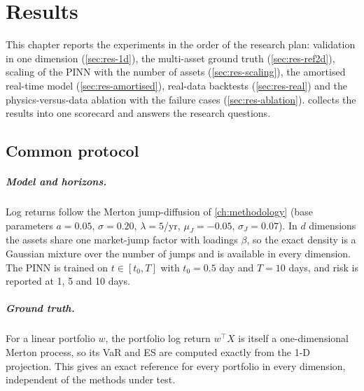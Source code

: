 \chapter{Results}
\label{ch:results}

This chapter reports the experiments in the order of the research plan: validation in one dimension
(\cref{sec:res-1d}), the multi-asset ground truth (\cref{sec:res-ref2d}), scaling of the PINN with the
number of assets (\cref{sec:res-scaling}), the amortised real-time model (\cref{sec:res-amortised}),
real-data backtests (\cref{sec:res-real}) and the physics-versus-data ablation with the failure cases
(\cref{sec:res-ablation}).  collects the results into one scorecard and answers the
research questions.

\section{Common protocol}
\label{sec:res-protocol}

\paragraph{Model and horizons.} Log returns follow the Merton jump-diffusion of \cref{ch:methodology}
(base parameters $a = 0.05$, $\sigma = 0.20$, $\lambda = 5$/yr, $\mu_J = -0.05$, $\sigma_J = 0.07$). In $d$
dimensions the assets share one market-jump factor with loadings $\beta$, so the exact density is a
Gaussian mixture over the number of jumps and is available in every dimension. The PINN is trained on
$t \in [t_0, T]$ with $t_0 = 0.5$ day and $T = 10$ days, and risk is reported at 1, 5 and 10 days.

\paragraph{Ground truth.} For a linear portfolio $w$, the portfolio log return $w^\top X$ is itself a
one-dimensional Merton process, so its VaR and ES are computed exactly from the 1-D projection. This gives an
exact reference for every portfolio in every dimension, independent of the methods under test.

